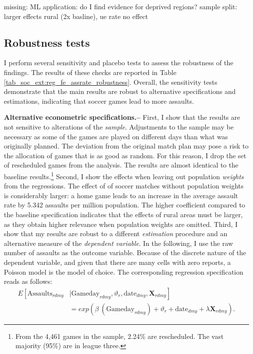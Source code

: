\documentclass[11pt, a4paper]{article} %
\begin{document}
{\color{red} missing: ML application: do I find evidence for deprived regions?}\newline
sample split: larger effects rural (2x basline), ue rate no effect 










\subsection{Robustness tests}
I perform several sensitivity and placebo tests to assess the robustness of the findings. The results of these checks are reported in Table \ref{tab_soc_ext:reg_fe_assrate_robustness}. Overall, the sensitivity tests demonstrate that the main results are robust to alternative specifications and estimations, indicating that soccer games lead to more assaults.\newline


\textbf{Alternative econometric specifications.--} First, I show that the results are not sensitive to alterations of the \textit{sample}. Adjustments to the sample may be necessary as some of the games are played on different days than what was originally planned. The deviation from the original match plan may pose a risk to the allocation of games that is as good as random. For this reason, I drop the set of rescheduled games from the analysis. The results are almost identical to the baseline results.\footnote{From the 4,461 games in the sample, 2.24\% are rescheduled. The vast majority (95\%) are in league three.} Second, I show the effects when leaving out population \textit{weights} from the regressions. The effect of of soccer matches without population weights is considerably larger: a home game leads to an increase in the average assault rate by 5.342 assaults per million population. The higher coefficient compared to the baseline specification indicates that the effects of rural areas must be larger, as they obtain higher relevance when population weights are omitted. Third, I show that my results are robust to a different \textit{estimation} procedure and an alternative measure of the \textit{dependent variable}. In the following, I use the raw number of assaults as the outcome variable. Because of the discrete nature of the dependent variable, and given that there are many cells with zero reports, a Poisson model is the model of choice. The corresponding regression specification reads as follows:
\begin{align}
E\left[ \text{Assaults}_{rdmy}\right.&|\left.\text{Gameday}_{rdmy},\vartheta_r,\text{date}_{dmy}, \mathbf{X}_{rdmy} \right] \nonumber \\ &= exp\left( \beta\ (\text{Gameday}_{rdmy}) + \vartheta_r + \text{date}_{dmy} + \lambda\mathbf{X}_{rdmy} \right). 
\label{eq_soc_ext:poisson_model}
\end{align}
\end{document}
